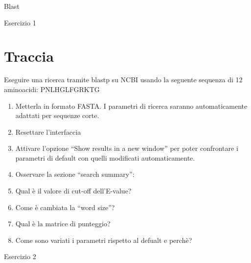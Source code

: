 \documentclass{article}
\begin{document}
\begin{center}
   \Huge
   Blast
\end{center}

\begin{center}
   \huge
   Esercizio 1
\end{center}
\section*{Traccia}
Eseguire una ricerca tramite blastp su NCBI usando la seguente sequenza di 12 aminoacidi:
PNLHGLFGRKTG
\begin{enumerate}
   \item Metterla in formato FASTA. I parametri di ricerca saranno automaticamente adattati per sequenze corte.
   \item Resettare l'interfaccia
   \item Attivare l'opzione “Show results in a new window” per poter confrontare i parametri di default con quelli modificati automaticamente.
   \item Osservare la sezione “search summary”:
   \item Qual è il valore di cut-off dell'E-value?
   \item Come è cambiata la “word size”?
   \item Qual è la matrice di punteggio?
   \item Come sono variati i parametri rispetto al defualt e perchè?
\end{enumerate}

\begin{center}
   \huge
   Esercizio 2
\end{center}
\end{document}
